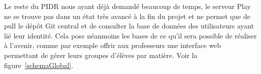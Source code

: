 Le reste du PIDR nous ayant déjà demandé beaucoup de temps, le serveur Play ne se trouve pas dans un état très avancé à la fin du projet et ne permet que de pull le dépôt Git central et de consulter la base de données des utilisateurs ayant lié leur identité. Cela pose néanmoins les bases de ce qu'il sera possible de réaliser à l'avenir, comme par exemple offrir aux professeurs une interface web permettant de gérer leurs groupes d'élèves par matière. Voir la figure~\ref{schemaGlobal}.

